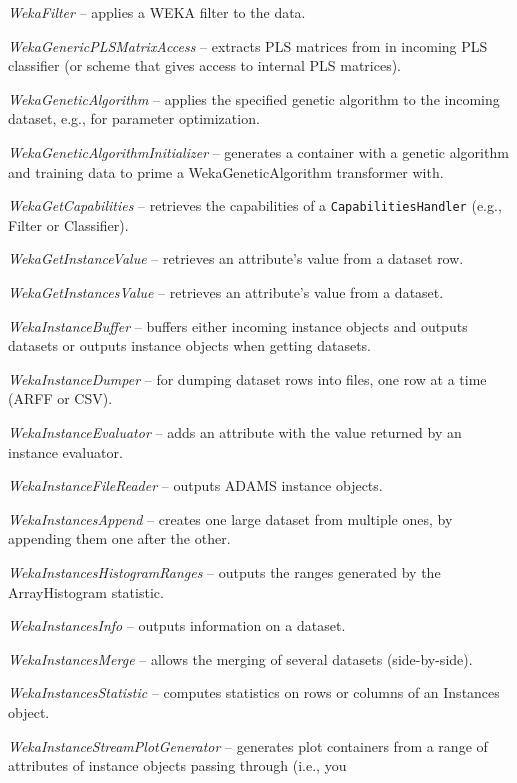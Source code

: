\begin{tight_itemize}
	\item \textit{WekaFilter} -- applies a WEKA filter to the data.
	\item \textit{WekaGenericPLSMatrixAccess} -- extracts PLS matrices from in
	incoming PLS classifier (or scheme that gives access to internal PLS matrices).
	\item \textit{WekaGeneticAlgorithm} -- applies the specified genetic
	algorithm to the incoming dataset, e.g., for parameter optimization.
	\item \textit{WekaGeneticAlgorithmInitializer} -- generates a container
	with a genetic algorithm and training data to prime a WekaGeneticAlgorithm
	transformer with.
	\item \textit{WekaGetCapabilities} -- retrieves the capabilities of a
	\texttt{CapabilitiesHandler} (e.g., Filter or Classifier).
	\item \textit{WekaGetInstanceValue} -- retrieves an attribute's value from
	a dataset row.
	\item \textit{WekaGetInstancesValue} -- retrieves an attribute's value from
	a dataset.
	\item \textit{WekaInstanceBuffer} -- buffers either incoming instance 
	objects and outputs datasets or outputs instance objects when getting
	datasets.
	\item \textit{WekaInstanceDumper} -- for dumping dataset rows into files,
	one row at a time (ARFF or CSV).
	\item \textit{WekaInstanceEvaluator} -- adds an attribute with the value
	returned by an instance evaluator.
	\item \textit{WekaInstanceFileReader} -- outputs ADAMS instance objects.
	\item \textit{WekaInstancesAppend} -- creates one large dataset from 
	multiple ones, by appending them one after the other.
	\item \textit{WekaInstancesHistogramRanges} -- outputs the ranges generated by the
	ArrayHistogram statistic.
	\item \textit{WekaInstancesInfo} -- outputs information on a dataset.
	\item \textit{WekaInstancesMerge} -- allows the merging of several datasets 
	(side-by-side).
	\item \textit{WekaInstancesStatistic} -- computes statistics on rows
	or columns of an Instances object.
	\item \textit{WekaInstanceStreamPlotGenerator} -- generates plot containers
	from a range of attributes of instance objects passing through (i.e., you 

\end{tight_itemize}
